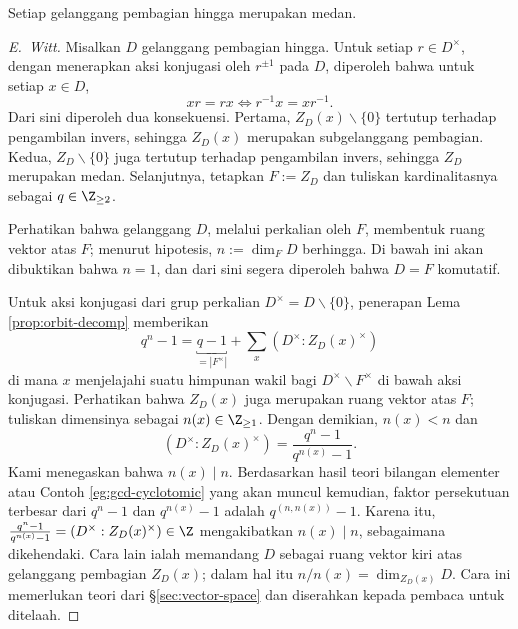 \begin{theorem}\label{prop:Wedderburn-little-thm}
	Setiap gelanggang pembagian hingga merupakan medan.
\end{theorem}
\begin{proof}[E.\ Witt]
	Misalkan $D$ gelanggang pembagian hingga. Untuk setiap $r \in D^\times$, dengan menerapkan aksi konjugasi oleh $r^{\pm 1}$ pada $D$, diperoleh bahwa untuk setiap $x \in D$,
	\[ xr = rx \iff r^{-1}x = xr^{-1}. \]
	Dari sini diperoleh dua konsekuensi. Pertama, $Z_D(x) \smallsetminus \{0\}$ tertutup terhadap pengambilan invers, sehingga $Z_D(x)$ merupakan subgelanggang pembagian. Kedua, $Z_D \smallsetminus \{0\}$ juga tertutup terhadap pengambilan invers, sehingga $Z_D$ merupakan medan. Selanjutnya, tetapkan $F := Z_D$ dan tuliskan kardinalitasnya sebagai $q \in \Z_{\geq 2}$.

	Perhatikan bahwa gelanggang $D$, melalui perkalian oleh $F$, membentuk ruang vektor atas $F$; menurut hipotesis, $n := \dim_F D$ berhingga. Di bawah ini akan dibuktikan bahwa $n = 1$, dan dari sini segera diperoleh bahwa $D = F$ komutatif.

	Untuk aksi konjugasi dari grup perkalian $D^\times = D \smallsetminus \{0\}$, penerapan Lema \ref{prop:orbit-decomp} memberikan
	\begin{equation}\label{eqn:Wedderburn-little}
		q^n - 1 = \underbracket{q-1}_{= |F^\times|} + \sum_x (D^\times : Z_D(x)^\times)
	\end{equation}
	di mana $x$ menjelajahi suatu himpunan wakil bagi $D^\times \smallsetminus F^\times$ di bawah aksi konjugasi. Perhatikan bahwa $Z_D(x)$ juga merupakan ruang vektor atas $F$; tuliskan dimensinya sebagai $n(x) \in \Z_{\geq 1}$. Dengan demikian, $n(x) < n$ dan
	\[ (D^\times : Z_D(x)^\times) = \dfrac{q^n - 1}{q^{n(x)} - 1}. \]
	Kami menegaskan bahwa $n(x) \mid n$. Berdasarkan hasil teori bilangan elementer atau Contoh \ref{eg:gcd-cyclotomic} yang akan muncul kemudian, faktor persekutuan terbesar dari $q^n - 1$ dan $q^{n(x)} - 1$ adalah $q^{(n, n(x))} - 1$. Karena itu, $\frac{q^n - 1}{q^{n(x)} - 1} = (D^\times : Z_D(x)^\times) \in \Z$ mengakibatkan $n(x) \mid n$, sebagaimana dikehendaki. Cara lain ialah memandang $D$ sebagai ruang vektor kiri atas gelanggang pembagian $Z_D(x)$; dalam hal itu $n/n(x) = \dim_{Z_D(x)} D$. Cara ini memerlukan teori dari \S\ref{sec:vector-space} dan diserahkan kepada pembaca untuk ditelaah.
	

\end{proof}
